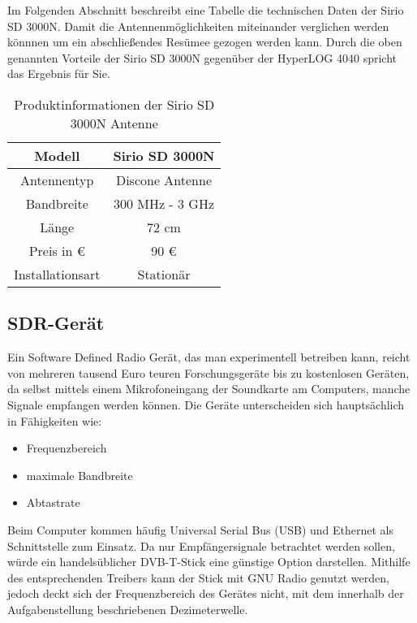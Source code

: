 Im Folgenden Abschnitt beschreibt eine Tabelle die technischen Daten der Sirio SD 3000N. Damit die Antennenmöglichkeiten miteinander verglichen werden könnnen um ein abschließendes Resümee gezogen werden kann. Durch die oben genannten Vorteile der Sirio SD 3000N gegenüber der HyperLOG 4040 spricht das Ergebnis für Sie. 

\begin{table}[H]
	\centering
	\begin{tabular}{c|c}
		Modell & Sirio SD 3000N\\
		\hline
		Antennentyp & Discone Antenne\\ 
		\hline 
		Bandbreite & 300 MHz - 3 GHz\\ 
		\hline 
		Länge &  72 cm\\ 
		\hline 
		Preis in \euro &  90 \euro \\ 
		\hline 
		Installationsart & Stationär\\ 
		
	\end{tabular} 
	\caption{Produktinformationen der Sirio SD 3000N Antenne}
\end{table}


\subsection{SDR-Gerät} 
Ein Software Defined Radio Gerät, das man experimentell betreiben kann, reicht von mehreren tausend Euro teuren Forschungsgeräte bis zu kostenlosen Geräten, da selbst mittels einem Mikrofoneingang der Soundkarte am Computers, manche Signale empfangen werden können. Die Geräte unterscheiden sich hauptsächlich in Fähigkeiten wie:

\begin{itemize}
	\item Frequenzbereich
	\item maximale Bandbreite
	\item Abtastrate
\end{itemize}

Beim Computer kommen häufig Universal Serial Bus (USB) und Ethernet als Schnittstelle zum  Einsatz.
Da nur Empfängersignale betrachtet werden sollen, würde ein handelsüblicher DVB-T-Stick eine günstige Option darstellen. Mithilfe des entsprechenden Treibers kann der Stick mit GNU Radio genutzt werden, jedoch deckt sich der Frequenzbereich des Gerätes nicht, mit dem innerhalb der Aufgabenstellung beschriebenen Dezimeterwelle.\\

